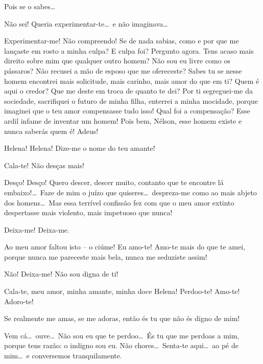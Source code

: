 {   Pois se o sabes\ldots

   Não sei! Queria
experimentar{}-te\ldots\ e não imaginava\ldots

   Experimentar{}-me! Não
compreendo! Se de nada sabias, como e por que me lançaste em rosto a
minha culpa? E culpa foi? Pergunto agora. Tens acaso mais direito sobre
mim que qualquer outro homem? Não sou eu livre como os pássaros? Não
recusei a mão de esposo que me ofereceste? Sabes tu se nesse homem
encontrei mais solicitude, mais carinho, mais amor do que em ti? Quem é
aqui o credor? Que me deste em troca de quanto te dei? Por ti
segreguei{}-me da sociedade, sacrifiquei o futuro de minha filha,
enterrei a minha mocidade, porque imaginei que o teu amor compensasse
tudo isso! Qual foi a compensação? Esse ardil infame de inventar um
homem! Pois bem, Nélson, esse homem existe e nunca saberás quem é!
Adeus!

  Helena!
Helena! Dize{}-me o nome do teu amante!

  Cala{}-te! Não desças mais!

 
Desço! Desço! Quero descer, descer muito, contanto que te
encontre lá embaixo!\ldots\ Faze de mim o juízo que quiseres\ldots\ despreza{}-me
como ao mais abjeto dos homens\ldots\ Mas essa terrível confissão fez com
que o meu amor extinto despertasse mais violento, mais impetuoso que
nunca!

  Deixa{}-me! Deixa{}-me.

  Ao meu amor faltou isto -- o ciúme! Eu amo{}-te!
Amo{}-te mais do que te amei, porque nunca me pareceste mais bela, nunca
me seduziste assim!

  Não! Deixa{}-me! Não sou digna de ti!

  Cala{}-te, meu amor, minha amante, minha doce
Helena! Perdoo{}-te! Amo{}-te! Adoro{}-te!

  Se realmente me amas, se me adoras, então és
tu que não és digno de mim! 

   Vem cá\ldots\ 
ouve\ldots\ Não sou eu que te perdoo\ldots\ És tu que me perdoas a mim, porque
tens razão: o indigno sou eu. \paren{Helena finge que chora.} Não
chores\ldots\ Senta{}-te aqui\ldots\ ao pé de mim\ldots\ e conversemos
tranquilamente. 

}
